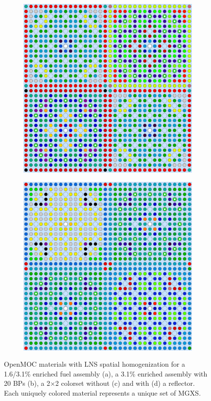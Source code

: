 \begin{figure}[h!]
\begin{subfigure}{.47\textwidth}
  \caption{}
  \label{fig:chap9-31-20BPs-lns-materials}
\end{subfigure}
\begin{subfigure}{.47\textwidth}
  \centering
  \includegraphics[width=0.9\linewidth]{figures/patterns/lns/2x2/materials}
  \caption{}
  \label{fig:chap9-2x2-lns-materials}
\end{subfigure}%
\begin{subfigure}{.47\textwidth}
  \centering
  \includegraphics[width=0.9\linewidth]{figures/patterns/lns/reflector/materials}
  \caption{}
  \label{fig:chap9-reflector-lns-materials}
\end{subfigure}
\caption[Depiction of \ac{LNS} spatially homogenized materials]{OpenMOC materials with \ac{LNS} spatial homogenization for a 1.6/3.1\% enriched fuel assembly (a), a 3.1\% enriched assembly with 20 \acp{BP} (b), a 2$\times$2 colorset without (c) and with (d) a reflector. Each uniquely colored material represents a unique set of \ac{MGXS}.}
\label{fig:chap9-lns-materials}
\end{figure}

